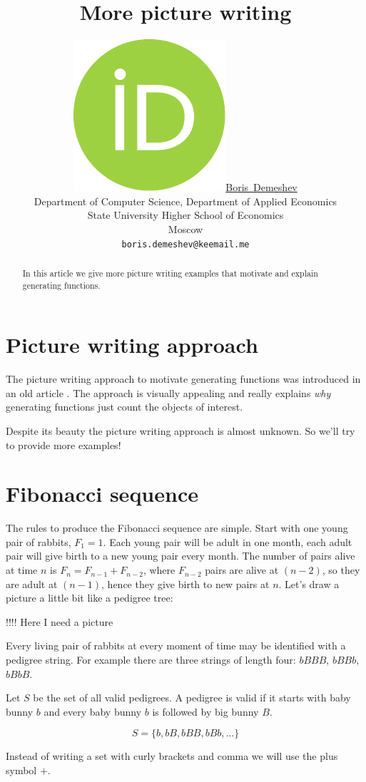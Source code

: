 \documentclass{article}
\title{More picture writing}
\author{ \href{https://orcid.org/0000-0003-2284-3204}{\includegraphics[scale=0.06]{orcid.pdf}\hspace{1mm}Boris~Demeshev}\\ %
	Department of Computer Science, Department of Applied Economics\\
	State University Higher School of Economics\\
	Moscow \\
	\texttt{boris.demeshev@keemail.me} \\
}
\newcommand{\bigb}{B}
\newcommand{\babyb}{b}
\begin{document}
\maketitle

\begin{abstract}
	In this article we give more picture writing examples that motivate and explain generating functions. 
\end{abstract}


\section{Picture writing approach}

The picture writing approach to motivate generating functions was introduced in an old article \cite{polya1956picture}.
The approach is visually appealing and really explains \textit{why} generating functions just count the objects of interest.

Despite its beauty the picture writing approach is almost unknown. So we'll try to provide more examples!


\section{Fibonacci sequence}


The rules to produce the Fibonacci sequence are simple. 
Start with one young pair of rabbits, $F_1 = 1$. 
Each young pair will be adult in one month, each adult pair will give birth to a new young pair every month. 
The number of pairs alive at time $n$ is $F_n = F_{n-1} + F_{n-2}$, 
where $F_{n-2}$ pairs are alive at $(n-2)$, so they are 
adult at $(n-1)$, hence they give birth to new pairs at $n$. 
Let's draw a picture a little bit like a pedigree tree:


!!!! Here I need a picture

Every living pair of rabbits at every moment of time may be identified with a pedigree string.
For example there are three strings of length four: $\babyb\bigb\bigb\bigb$, 
$\babyb\bigb\bigb\babyb$, $\babyb\bigb\babyb\bigb$.

Let $S$ be the set of all valid pedigrees. 
A pedigree is valid if it starts with baby bunny $\babyb$ and every baby bunny $\babyb$ is followed by big bunny $\bigb$. 

\[
S = \{ \babyb, \babyb\bigb, \babyb\bigb\bigb, \babyb\bigb\babyb, \ldots \} 	
\]

Instead of writing a set with curly brackets and comma we will use the plus symbol $+$.
\end{document}
